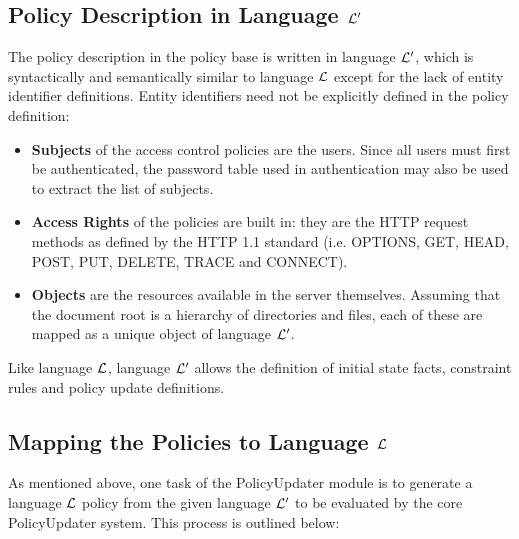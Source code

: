 \documentclass[11pt, twocolumn]{article}
\begin{document}
    \subsection{Policy Description in Language ${\cal L'}$}

      The policy description in the policy base is written in language
      ${\cal L'}$, which is syntactically and semantically similar to
      language ${\cal L}$ except for the lack of entity identifier
      definitions. Entity identifiers need not be explicitly defined in
      the policy definition:

      \begin{itemize}
        \item
          {\bf Subjects} of the access control policies are the users. Since
          all users must first be authenticated, the password table used
          in authentication may also be used to extract the list of subjects.
        \item
          {\bf Access Rights} of the policies are built in: they are the
          HTTP request methods as defined by the HTTP 1.1 standard
          \cite{HTTP1} (i.e. OPTIONS, GET, HEAD, POST, PUT, DELETE, TRACE
          and CONNECT).
        \item
          {\bf Objects} are the resources available in the server themselves.
          Assuming that the document root is a hierarchy of directories and
          files, each of these are mapped as a unique object of language
          ${\cal L'}$.
      \end{itemize}

      Like language ${\cal L}$, language ${\cal L'}$ allows the definition of
      initial state facts, constraint rules and policy update definitions.

    \subsection{Mapping the Policies to Language ${\cal L}$}

      As mentioned above, one task of the PolicyUpdater module is to generate
      a language ${\cal L}$ policy from the given language ${\cal L'}$ to be
      evaluated by the core PolicyUpdater system. This process is outlined
      below:
\end{document}
